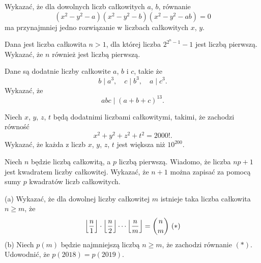 \begin{problem}{1}
	Wykazać, że dla dowolnych liczb całkowitych $a$, $b$, równanie
	\[
		(x^2 - y^2 - a)(x^2 - y^2 - b)(x^2 - y^2 - ab) = 0
	\]
	ma przynajmniej jedno rozwiązanie w liczbach całkowitych $x$, $y$.
\end{problem}

\begin{problem}{2}
	Dana jest liczba całkowita $n > 1$, dla której liczba $2^{2^n - 1} - 1$ jest liczbą pierwszą. Wykazać, że $n$ również jest liczbą pierwszą.
\end{problem}

\begin{problem}{3}
	Dane są dodatnie liczby całkowite $a$, $b$ i $c$, takie że
	\[
		b \mid a^3, \quad c \mid b^3, \quad a \mid c^3.
	\]
	Wykazać, że
	\[
		abc \mid (a + b + c)^{13}.
	\]
\end{problem}

\begin{problem}{4}
	Niech $x$, $y$, $z$, $t$ będą dodatnimi liczbami całkowitymi, takimi, że zachodzi równość
	\[
		x^2 + y^2 + z^2 + t^2 = 2000!.
	\]
	Wykazać, że każda z liczb $x$, $y$, $z$, $t$ jest większa niż $10^{200}$.
\end{problem}

\begin{problem}{5}
	Niech $n$ będzie liczbą całkowitą, a $p$ liczbą pierwszą. Wiadomo, że liczba $np + 1$ jest kwadratem liczby całkowitej. Wykazać, że $n + 1$ można zapisać za pomocą sumy $p$ kwadratów liczb całkowitych.
\end{problem}


\begin{problem}{6}
	(a) Wykazać, że dla dowolnej liczby całkowitej $m$ istnieje taka liczba całkowita $n\geqslant m$, że
\[
	\left \lfloor \frac{n}{1} \right \rfloor \cdot \left \lfloor \frac{n}{2} \right \rfloor \cdots \left \lfloor \frac{n}{m} \right \rfloor = \binom{n}{m} \\\\\\\\\\\\\\\        (*)
\]
(b) Niech $p(m)$ będzie najmniejszą liczbą $n \geqslant m$, że zachodzi równanie  $(*)$. Udowodnić, że $p(2018) = p(2019).$
\end{problem}







